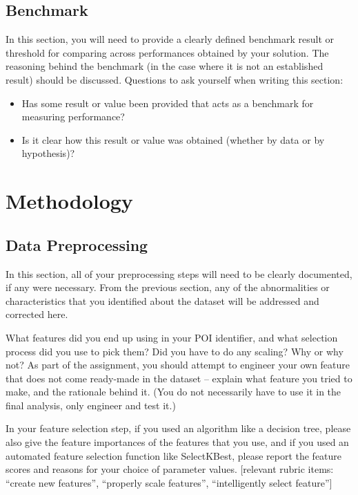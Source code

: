\documentclass[twoside,openright,titlepage,numbers=noenddot,headinclude,%
               footinclude=true,cleardoublepage=empty,abstractoff,BCOR=5mm,%
               paper=a4,fontsize=11pt,ngerman,american]{scrreprt}
\numberwithin{theorem}{chapter}
\numberwithin{definition}{chapter}
\numberwithin{algorithm}{chapter}
\numberwithin{figure}{chapter}
\numberwithin{table}{chapter}
\numberwithin{equation}{chapter}
\begin{document}
\begin{itemize}
\section*{Benchmark}

In this section, you will need to provide a clearly defined benchmark result or threshold for comparing across performances obtained by your solution. The reasoning behind the benchmark (in the case where it is not an established result) should be discussed. Questions to ask yourself when writing this section:
\begin{itemize}%
\item Has some result or value been provided that acts as a benchmark for measuring performance?
\item Is it clear how this result or value was obtained (whether by data or by hypothesis)?
\end{itemize}

\chapter*{Methodology}

\section*{Data Preprocessing}
In this section, all of your preprocessing steps will need to be clearly documented, if any were necessary. From the previous section, any of the abnormalities or characteristics that you identified about the dataset will be addressed and corrected here. 

What features did you end up using in your POI identifier, and what selection process did you use to pick them? Did you have to do any scaling? Why or why not? As part of the assignment, you should attempt to engineer your own feature that does not come ready-made in the dataset -- explain what feature you tried to make, and the rationale behind it. (You do not necessarily have to use it in the final analysis, only engineer and test it.) 

In your feature selection step, if you used an algorithm like a decision tree, please also give the feature importances of the features that you use, and if you used an automated feature selection function like SelectKBest, please report the feature scores and reasons for your choice of parameter values.  [relevant rubric items: ``create new features'', ``properly scale features'', ``intelligently select feature'']


\end{itemize}
\end{document}
